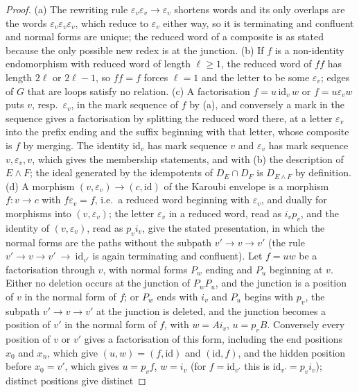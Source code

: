 \documentclass[11pt]{amsart}
\theoremstyle{definition}
\begin{document}
\begin{proof}
(a) The rewriting rule $\varepsilon_v\varepsilon_v\to\varepsilon_v$
shortens words and its only overlaps are the words
$\varepsilon_v\varepsilon_v\varepsilon_v$, which reduce to
$\varepsilon_v$ either way, so it is terminating and confluent and
normal forms are unique; the reduced word of a composite is as stated
because the only possible new redex is at the junction. (b) If $f$ is a
non-identity endomorphism with reduced word of length $\ell\ge1$, the
reduced word of $ff$ has length $2\ell$ or $2\ell-1$, so $ff=f$ forces
$\ell=1$ and the letter to be some $\varepsilon_v$; edges of $G$ that are
loops satisfy no relation. (c) A factorisation $f=u\,\mathrm{id}_v\,w$
or $f=u\varepsilon_vw$ puts $v$, resp.\ $\varepsilon_v$, in the mark
sequence of $f$ by (a), and conversely a mark in the sequence gives a
factorisation by splitting the reduced word there, at a letter
$\varepsilon_v$ into the prefix ending and the suffix beginning with
that letter, whose composite is $f$ by merging. The identity $\mathrm
{id}_v$ has mark sequence $v$ and $\varepsilon_v$ has mark sequence
$v,\varepsilon_v,v$, which gives the membership statements, and with (b)
the description of $E\wedge F$; the ideal generated by the idempotents
of $D_E\cap D_F$ is $D_{E\wedge F}$ by definition. (d) A morphism
$(v,\varepsilon_v)\to(c,\mathrm{id})$ of the Karoubi envelope is a
morphism $f\colon v\to c$ with $f\varepsilon_v=f$, i.e.\ a reduced word
beginning with $\varepsilon_v$, and dually for morphisms into
$(v,\varepsilon_v)$; the letter $\varepsilon_v$ in a reduced word, read
as $i_vp_v$, and the identity of $(v,\varepsilon_v)$, read as
$p_vi_v$, give the stated presentation, in which the normal forms are the
paths without the subpath $v'\to v\to v'$ (the rule $v'\to v\to v'\ \to\
\mathrm{id}_{v'}$ is again terminating and confluent). Let $f=uw$ be a
factorisation through $v$, with normal forms $P_w$ ending and $P_u$
beginning at $v$. Either no deletion occurs at the junction of $P_wP_u$,
and the junction is a position of $v$ in the normal form of $f$; or
$P_w$ ends with $i_v$ and $P_u$ begins with $p_v$, the subpath $v'\to
v\to v'$ at the junction is deleted, and the junction becomes a position
of $v'$ in the normal form of $f$, with $w=Ai_v$, $u=p_vB$. Conversely
every position of $v$ or $v'$ gives a factorisation of this form,
including the end positions $x_0$ and $x_n$, which give $(u,w)=(f,
\mathrm{id})$ and $(\mathrm{id},f)$, and the hidden position before
$x_0=v'$, which gives $u=p_vf$, $w=i_v$ (for $f=\mathrm{id}_{v'}$ this is
$\mathrm{id}_{v'}=p_vi_v$); distinct positions give distinct

\end{proof}
\end{document}
